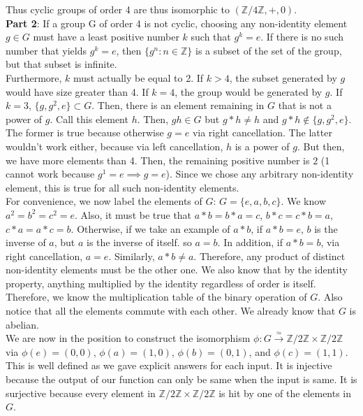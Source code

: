 \documentclass{amsart}
\begin{document}
\begin{enumerate}[itemsep=0.4in]
Thus cyclic groups of order 4 are thus isomorphic to $(\mathbb{Z}/4\mathbb{Z},+,0)$.\\

\textbf{Part 2}: If a group G of order 4 is not cyclic, choosing any non-identity element $g\in G$ must have a least positive number $k$ such that $g^k=e$. If there is no such number that yields $g^k=e$, then $\{g^n:n\in\mathbb{Z}\}$ is a subset of the set of the group, but that subset is infinite. \\

Furthermore, $k$ must actually be equal to 2. If $k>4$, the subset generated by $g$ would have size greater than 4. If $k=4$, the group would be generated by $g$. If $k=3$, $\{g,g^2,e\}\subset G$. Then, there is an element remaining in $G$ that is not a power of $g$. Call this element $h$. Then, $gh\in G$ but $g*h\neq h$ and $g*h\notin\{g,g^2,e\}$. The former is true because otherwise $g=e$ via right cancellation. The latter wouldn't work either, because via left cancellation, $h$ is a power of $g$. But then, we have more elements than 4. Then, the remaining positive number is $2$ (1 cannot work because $g^1=e\implies g=e$). Since we chose any arbitrary non-identity element, this is true for all such non-identity elements.\\

For convenience, we now label the elements of $G$: $G=\{e,a,b,c\}$. We know $a^2=b^2=c^2=e$. Also, it must be true that $a*b=b*a=c$, $b*c=c*b=a$, $c*a=a*c=b$. Otherwise, if we take an example of $a*b$, if $a*b=e$, $b$ is the inverse of $a$, but $a$ is the inverse of itself. so $a=b$. In addition, if $a*b=b$, via right cancellation, $a=e$. Similarly, $a*b\neq a$. Therefore, any product of distinct non-identity elements must be the other one. We also know that by the identity property, anything multiplied by the identity regardless of order is itself. Therefore, we know the multiplication table of the binary operation of $G$. Also notice that all the elements commute with each other. We already know that $G$ is abelian.\\

We are now in the position to construct the isomorphism $\phi: G\xrightarrow{\simeq}\mathbb{Z}/2\mathbb{Z}\times\mathbb{Z}/2\mathbb{Z}$ via $\phi(e)=(0,0)$, $\phi(a)=(1,0)$, $\phi(b)=(0,1)$, and $\phi(c)=(1,1)$. This is well defined as we gave explicit answers for each input. It is injective because the output of our function can only be same when the input is same. It is surjective because every element in $\mathbb{Z}/2\mathbb{Z}\times\mathbb{Z}/2\mathbb{Z}$ is hit by one of the elements in $G$. \\


\end{enumerate}
\end{document}
